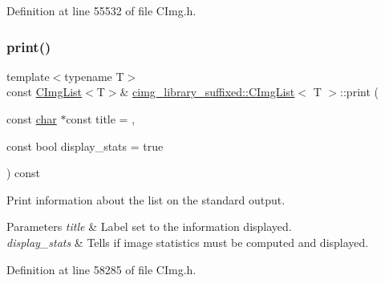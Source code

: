 Definition at line 55532 of file C\+Img.\+h.

\mbox{\label{structcimg__library__suffixed_1_1CImgList_a2ad854dec4e99ffe2db1bf551ac388b6}} 
\subsubsection{\texorpdfstring{print()}{print()}}
{\footnotesize\ttfamily template$<$typename T$>$ \\
const \hyperlink{structcimg__library__suffixed_1_1CImgList}{C\+Img\+List}$<$T$>$\& \hyperlink{structcimg__library__suffixed_1_1CImgList}{cimg\+\_\+library\+\_\+suffixed\+::\+C\+Img\+List}$<$ T $>$\+::print (\begin{DoxyParamCaption}\item[{const \hyperlink{classchar}{char} $\ast$const}]{title = {},  }\item[{const bool}]{display\+\_\+stats = {\ttfamily true} }\end{DoxyParamCaption}) const\hspace{0.3cm}{\ttfamily [inline]}}



Print information about the list on the standard output. 


\begin{DoxyParams}{Parameters}
{\em title} & Label set to the information displayed. \\
\hline
{\em display\+\_\+stats} & Tells if image statistics must be computed and displayed. \\
\hline
\end{DoxyParams}


Definition at line 58285 of file C\+Img.\+h.

\mbox{\label{structcimg__library__suffixed_1_1CImgList_ac84a1c643e314bf2aeb8267a44e9970d}} 
